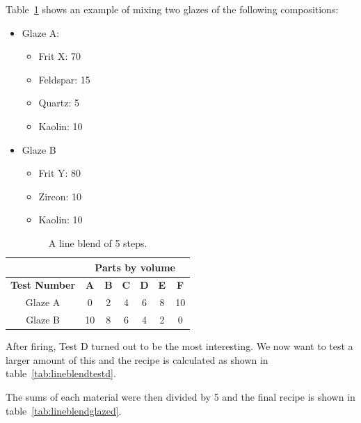 Table~\ref{tab:lineblend5} shows an example of mixing two glazes of the 
following compositions:
\begin{itemize}
\item Glaze A:
\begin{itemize}
\item Frit X: 70
\item Feldspar: 15
\item Quartz: 5
\item Kaolin: 10
\end{itemize}
\item Glaze B
\begin{itemize}
  \item Frit Y: 80
  \item Zircon: 10
  \item Kaolin: 10
\end{itemize}
\end{itemize}
\begin{center}
  \renewcommand{\arraystretch}{1.5}
  \begin{table}\centering
    \begin{tabular}{|c||c|c|c|c|c|c|}\hline
      &\multicolumn{6}{c}{\textbf{Parts by volume}}\vline\\\hline\hline
      \textbf{Test Number}
      &\textbf{A}&\textbf{B}&\textbf{C}&\textbf{D}&\textbf{E}&\textbf{F}\\\hline\hline
      Glaze A&0&2&4&6&8&10\\\hline
      Glaze B&10&8&6&4&2&0\\\hline
    \end{tabular}
    \caption{A line blend of 5 steps.}
    \label{tab:lineblend5}
  \end{table}
\end{center}
After firing, Test D turned out to be the most interesting. We now want 
to test a larger amount of this and the recipe is calculated as shown in 
table~\ref{tab:lineblendtestd}.

The sums of each material were then divided by 5 and the final recipe is shown 
in table~\ref{tab:lineblendglazed}.

